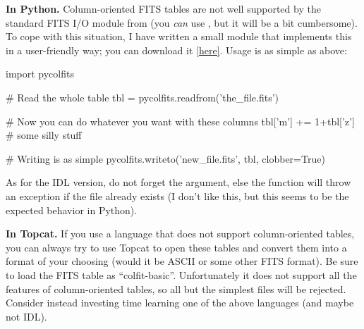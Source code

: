 {\bf In Python.} Column-oriented FITS tables are not well supported by the standard FITS I/O module from  (you \emph{can} use , but it will be a bit cumbersome). To cope with this situation, I have written a small module that implements this in a user-friendly way; you can download it \href{https://github.com/cschreib/phypp/blob/master/python/pycolfits.py}{[here]}. Usage is as simple as above:
\begin{pythoncode}
import pycolfits

# Read the whole table
tbl = pycolfits.readfrom('the_file.fits')

# Now you can do whatever you want with these columns
tbl['m'] += 1+tbl['z'] # some silly stuff

# Writing is as simple
pycolfits.writeto('new_file.fits', tbl, clobber=True)
\end{pythoncode}
As for the IDL version, do not forget the  argument, else the function will throw an exception if the file already exists (I don't like this, but this seems to be the expected behavior in Python).

{\bf In Topcat.} If you use a language that does not support column-oriented tables, you can always try to use Topcat to open these tables and convert them into a format of your choosing (would it be ASCII or some other FITS format). Be sure to load the FITS table as ``colfit-basic''. Unfortunately it does not support all the features of column-oriented tables, so all but the simplest files will be rejected. Consider instead investing time learning one of the above languages (and maybe not IDL).
